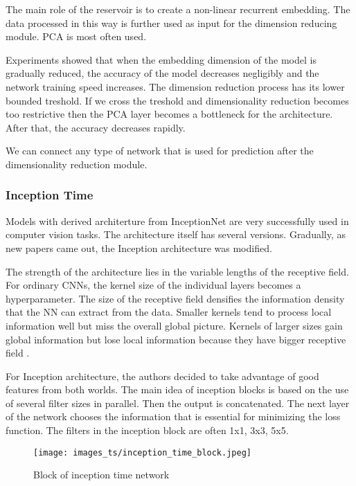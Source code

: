\documentclass[thesis=M,english]{FITthesis}[2019/12/23]
\begin{document}
The main role of the reservoir is to create a non-linear recurrent embedding. The data processed in this way is further used as input for the dimension reducing module. PCA is most often used.

Experiments \cite{echo_state_network_reservoir} showed that when the embedding dimension of the model is gradually reduced, the accuracy of the model decreases negligibly and the network training speed increases. The dimension reduction process has its lower bounded treshold. If we cross the treshold and dimensionality reduction becomes too restrictive then the PCA layer becomes a bottleneck for the architecture. After that, the accuracy decreases rapidly.

We can connect any type of network that is used for prediction after the dimensionality reduction module.

\subsubsection{Inception Time}
Models with derived architerture from InceptionNet are very successfully used in computer vision \cite{inception_net} tasks. The architecture itself has several versions. Gradually, as new papers came out, the Inception architecture was modified. 

The strength of the architecture lies in the variable lengths of the receptive field. For ordinary CNNs, the kernel size of the individual layers becomes a hyperparameter. The size of the receptive field densifies the information density that the NN can extract from the data. Smaller kernels tend to process local information well but miss the overall global picture. Kernels of larger sizes gain global information but lose local information because they have bigger receptive field \cite{inception_net}.

For Inception architecture, the authors decided to take advantage of good features from both worlds. The main idea of inception blocks is based on the use of several filter sizes in parallel. Then the output is concatenated. The next layer of the network chooses the information that is essential for minimizing the loss function. The filters in the inception block are often 1x1, 3x3, 5x5.

\begin{figure}[ht!]
    \texttt{[image: images\_ts/inception\_time\_block.jpeg]}
    \caption{Block of inception time network} 
    \label{fig:inception_time_block}
    \centering
\end{figure}
\end{document}
